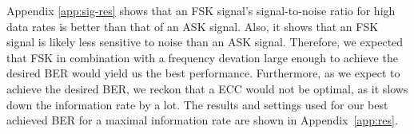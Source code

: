 \documentclass[11pt,titlepage]{report}
\begin{document}
Appendix \ref{app:sig-res} shows that an FSK signal's signal-to-noise ratio for high data rates is better than that of an ASK signal. Also, it shows that an FSK signal is likely less sensitive to noise than an ASK signal. Therefore, we expected that FSK in combination with a frequency devation large enough to achieve the desired BER would yield us the best performance. Furthermore, as we expect to achieve the desired BER, we reckon that a ECC would not be optimal, as it slows down the information rate by a lot. The results and settings used for our best achieved BER for a maximal information rate are shown in Appendix~\ref{app:res}.
\end{document}
